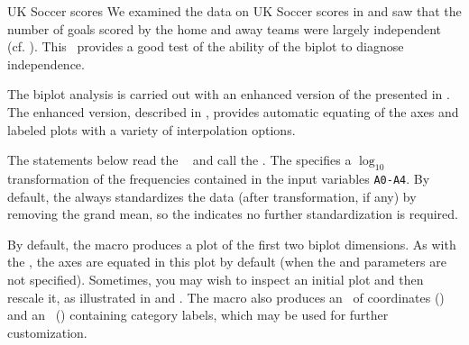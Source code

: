 \begin{Example}[soccer3]{UK Soccer scores}
We examined the data on UK Soccer scores in 
and saw that the number of goals scored by the home and away teams
were largely independent (cf. ).
This \Dset\ provides a good test of the ability of the biplot
to diagnose independence.

The biplot analysis is carried out with an enhanced version of
the  presented in .
The enhanced version, described in ,
provides automatic equating of the axes
and labeled plots with a variety of interpolation options.

The statements below read the \Dset\ 
and call the .  The 
specifies a $\log_{10}$ transformation of the frequencies
contained in the input variables \texttt{A0-A4}.
By default, the  always standardizes the data
(after transformation, if any) by removing the grand mean,
so the  indicates no further standardization
is required.


By default, the macro produces a plot of the first two biplot dimensions.
As with the , the axes are equated in this plot
by default (when the  and  parameters are
not specified).  Sometimes, you may wish
to inspect an initial plot and then
rescale it, as illustrated in  and .
The macro also produces an \ODS\ of coordinates () and an \ADS\ () containing category labels,
which may be used for further customization.


\end{Example}
